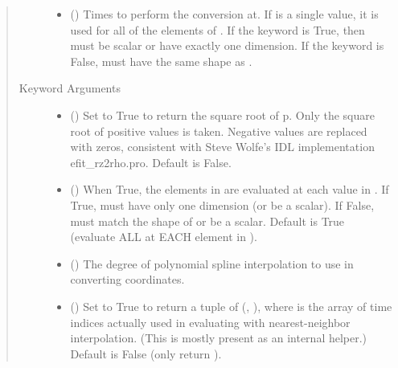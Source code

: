 \documentclass[letterpaper,10pt,english]{sphinxmanual}
\begin{document}
\begin{fulllineitems}
\begin{fulllineitems}
\begin{quote}
\begin{description}
\begin{itemize}
\item {} 
 () \textendash{} Times to perform the conversion at.
If  is a single value, it is used for all of the elements of
. If the  keyword is True, then  must be scalar
or have exactly one dimension. If the  keyword is False,
 must have the same shape as .

\end{itemize}

\item[{Keyword Arguments}] \leavevmode\begin{itemize}
\item {} 
 () \textendash{} Set to True to return the square root of p. Only
the square root of positive values is taken. Negative values are
replaced with zeros, consistent with Steve Wolfe’s IDL
implementation efit\_rz2rho.pro. Default is False.

\item {} 
 () \textendash{} When True, the elements in  are evaluated at
each value in . If True,  must have only one dimension (or
be a scalar). If False,  must match the shape of  or be
a scalar. Default is True (evaluate ALL  at EACH element in
).

\item {} 
 () \textendash{} The degree of polynomial spline interpolation to
use in converting coordinates.

\item {} 
 () \textendash{} Set to True to return a tuple of (,
), where  is the array of time indices
actually used in evaluating  with nearest-neighbor
interpolation. (This is mostly present as an internal helper.)
Default is False (only return ).


\end{itemize}
\end{description}
\end{quote}
\end{fulllineitems}
\end{fulllineitems}
\end{document}
